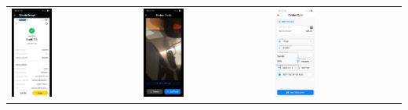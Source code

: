 \begin{tabular}{lll}
    \includegraphics[width=0.33\textwidth]{images/UI/qris-recheck.jpg} &
    \includegraphics[width=0.33\textwidth]{images/UI/qris-review.jpg} &
    \includegraphics[width=0.33\textwidth]{images/UI/qris-t.jpg}

\end{tabular}
